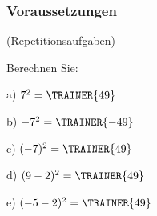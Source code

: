   \subsubsection{Voraussetzungen}
  (Repetitionsaufgaben)
  
Berechnen Sie:

a) $7^2 = \TRAINER{49}$

b) $-7^2 = \TRAINER{-49}$

c) $(-7)^2 = \TRAINER{49}$

d) $(9-2)^2 = \TRAINER{49}$

e) $(-5 - 2)^2 = \TRAINER{49}$

\TNTeop{
}%


